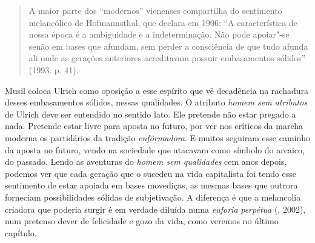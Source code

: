 {\begin{quote}
A maior parte dos ``modernos'' vienenses compartilha do sentimento
melancólico de Hofmannsthal, que declara em 1906: ``A característica de
nossa época é a ambiguidade e a indeterminação. Não pode apoiar"-se senão
em bases que afundam, sem perder a consciência de que tudo afunda ali
onde as gerações anteriores acreditavam possuir embasamentos sólidos''
(1993. p. 41).
\end{quote}

Musil coloca Ulrich como oposição a esse espírito que vê decadência na
rachadura desses embasamentos sólidos, nessas qualidades. O atributo
\emph{homem sem atributos} de Ulrich deve ser entendido no sentido lato.
Ele pretende não estar pregado a nada. Pretende estar livre para aposta
no futuro, por ver nos críticos da marcha moderna os partidários da
tradição \emph{enfôrmadora}. E muitos seguiram esse caminho da aposta no
futuro, vendo na sociedade que atacavam como símbolo do arcaico, do
passado. Lendo as aventuras do \emph{homem sem qualidades} cem anos
depois, podemos ver que cada geração que o sucedeu na vida capitalista
foi tendo esse sentimento de estar apoiada em bases movediças, as mesmas
bases que outrora forneciam possibilidades sólidas de subjetivação. A
diferença é que a melancolia criadora que poderia surgir é em verdade
diluída numa \emph{euforia} \emph{perpétua} (, 2002), num
pretenso dever de felicidade e gozo da vida, como veremos no último
capítulo.

}
